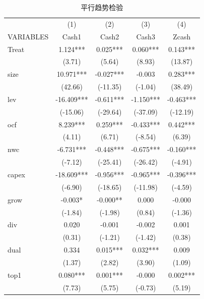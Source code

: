\documentclass{article}
\begin{document}
\begin{table}[H]
    \centering
    \caption{平行趋势检验}
    \begin{tabular}{@{}lcccc@{}}
    \toprule
                 & (1)         & (2)       & (3)       & (4)       \\ \cmidrule(l){2-5} 
    VARIABLES    & Cash1       & Cash2     & Cash3     & Zcash     \\ \midrule
    Treat        & 1.124***    & 0.025***  & 0.060***  & 0.143***  \\
                 & (3.71)      & (5.64)    & (8.93)    & (13.87)   \\
    size         & 10.971***   & -0.027*** & -0.003    & 0.283***  \\
                 & (42.66)     & (-11.35)  & (-1.04)   & (38.49)   \\
    lev          & -16.409***  & -0.611*** & -1.150*** & -0.463*** \\
                 & (-15.06)    & (-29.64)  & (-37.09)  & (-12.19)  \\
    ocf          & 8.239***    & 0.259***  & -0.433*** & 0.442***  \\
                 & (4.11)      & (6.71)    & (-8.54)   & (6.39)    \\
    nwc          & -6.731***   & -0.448*** & -0.675*** & -0.160*** \\
                 & (-7.12)     & (-25.41)  & (-26.42)  & (-4.91)   \\
    capex        & -18.609***  & -0.956*** & -0.965*** & -0.396*** \\
                 & (-6.90)     & (-18.65)  & (-11.98)  & (-4.59)   \\
    grow         & -0.003*     & -0.000**  & 0.000     & -0.000    \\
                 & (-1.84)     & (-1.98)   & (0.84)    & (-1.36)   \\
    div          & 0.020       & -0.001    & -0.002    & 0.001     \\
                 & (0.31)      & (-1.21)   & (-1.42)   & (0.38)    \\
    dual         & 0.334       & 0.015***  & 0.032***  & 0.009     \\
                 & (1.37)      & (2.82)    & (3.90)    & (1.09)    \\
    top1         & 0.080***    & 0.001***  & -0.000    & 0.002***  \\
                 & (7.73)      & (5.75)    & (-0.73)   & (5.19)    \\

\end{tabular}
\end{table}
\end{document}
